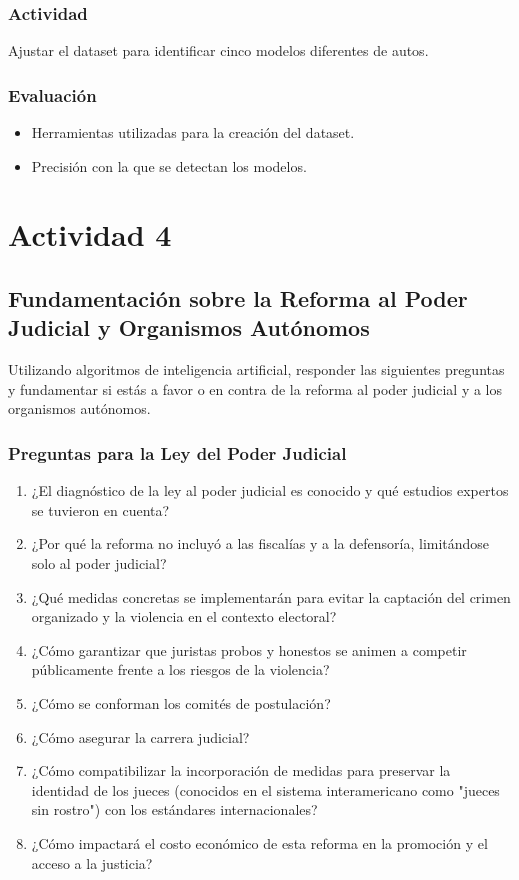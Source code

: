\documentclass[11pt]{article}
\begin{document}
\subsubsection*{Actividad}
\label{sec:org4bcefc5}
Ajustar el dataset para identificar cinco modelos diferentes de autos.

\subsubsection*{Evaluación}
\label{sec:org90ecfb6}
\begin{itemize}
\item Herramientas utilizadas para la creación del dataset.
\item Precisión con la que se detectan los modelos.
\end{itemize}

\section*{Actividad 4}
\label{sec:org1bf7a16}
\subsection*{Fundamentación sobre la Reforma al Poder Judicial y Organismos Autónomos}
\label{sec:org33fccee}
Utilizando algoritmos de inteligencia artificial, responder las siguientes preguntas y fundamentar si estás a favor o en contra de la reforma al poder judicial y a los organismos autónomos.

\subsubsection*{Preguntas para la Ley del Poder Judicial}
\label{sec:org0c9860f}
\begin{enumerate}
\item ¿El diagnóstico de la ley al poder judicial es conocido y qué estudios expertos se tuvieron en cuenta?
\item ¿Por qué la reforma no incluyó a las fiscalías y a la defensoría, limitándose solo al poder judicial?
\item ¿Qué medidas concretas se implementarán para evitar la captación del crimen organizado y la violencia en el contexto electoral?
\item ¿Cómo garantizar que juristas probos y honestos se animen a competir públicamente frente a los riesgos de la violencia?
\item ¿Cómo se conforman los comités de postulación?
\item ¿Cómo asegurar la carrera judicial?
\item ¿Cómo compatibilizar la incorporación de medidas para preservar la identidad de los jueces (conocidos en el sistema interamericano como "jueces sin rostro") con los estándares internacionales?
\item ¿Cómo impactará el costo económico de esta reforma en la promoción y el acceso a la justicia?
\end{enumerate}
\end{document}
